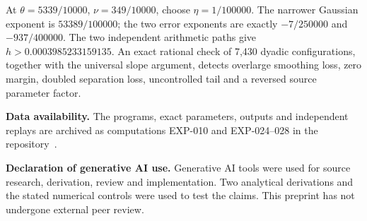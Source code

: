 \documentclass[11pt]{article}
\theoremstyle{remark}
\begin{document}
At $\theta=5339/10000$, $\nu=349/10000$, choose
$\eta=1/100000$. The narrower Gaussian exponent is $53389/100000$;
the two error exponents are exactly $-7/250000$ and $-937/400000$.
The two independent arithmetic paths give
$h>0.0003985233159135$. An exact rational check of 7,430 dyadic
configurations, together with the universal slope argument, detects
overlarge smoothing loss, zero margin, doubled separation loss,
uncontrolled tail and a reversed source parameter factor.

\medskip
\noindent\textbf{Data availability.} The programs, exact parameters, outputs
and independent replays are archived as computations EXP-010 and EXP-024--028 in the
repository~\cite{Record,Record28}.

\medskip
\noindent\textbf{Declaration of generative AI use.} Generative AI tools were
used for source research, derivation, review and implementation. Two analytical derivations and the stated numerical controls
were used to test the claims. This preprint has not undergone external peer review.
\end{document}
